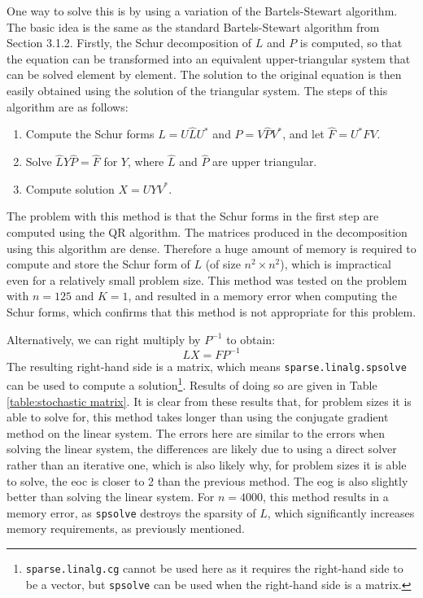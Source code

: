 \documentclass[11pt]{article}
\numberwithin{equation}{section}
\begin{document}
One way to solve this is by using a variation of the Bartels-Stewart algorithm. The basic idea is the same as the standard Bartels-Stewart algorithm from Section 3.1.2. Firstly, the Schur decomposition of $L$ and $P$ is computed, so that the equation can be transformed into an equivalent upper-triangular system that can be solved element by element. The solution to the original equation is then easily obtained using the solution of the triangular system. The steps of this algorithm are as follows:
\begin{enumerate}
\item Compute the Schur forms $L = U \hat{L} U^*$ and $P = V \hat{P} V^*$, and let $\hat{F} = U^* F V$.
\item Solve $\hat{L} Y \hat{P} = \hat{F}$ for $Y$, where $\hat{L}$ and $\hat{P}$ are upper triangular.
\item Compute solution $X = UYV^*$.
\end{enumerate}
The problem with this method is that the Schur forms in the first step are computed using the QR algorithm. The matrices produced in the decomposition using this algorithm are dense. Therefore a huge amount of memory is required to compute and store the Schur form of $L$ (of size $n^2 \times n^2$), which is impractical even for a relatively small problem size. This method was tested on the problem with $n=125$ and $K=1$, and resulted in a memory error when computing the Schur forms, which confirms that this method is not appropriate for this problem.

Alternatively, we can right multiply by $P^{-1}$ to obtain:
\begin{equation}
LX = FP^{-1}
\end{equation}
The resulting right-hand side is a matrix, which means \texttt{sparse.linalg.spsolve} can be used to compute a solution\footnote{\texttt{sparse.linalg.cg} cannot be used here as it requires the right-hand side to be a vector, but \texttt{spsolve} can be used when the right-hand side is a matrix.}. Results of doing so are given in Table \ref{table:stochastic matrix}. It is clear from these results that, for problem sizes it is able to solve for, this method takes longer than using the conjugate gradient method on the linear system. The errors here are similar to the errors when solving the linear system, the differences are likely due to using a direct solver rather than an iterative one, which is also likely why, for problem sizes it is able to solve, the eoc is closer to 2 than the previous method. The eog is also slightly better than solving the linear system. For $n=4000$, this method results in a memory error, as \texttt{spsolve} destroys the sparsity of $L$, which significantly increases memory requirements, as previously mentioned.
\end{document}
